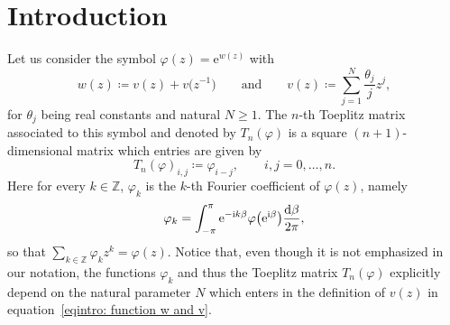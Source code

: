 \documentclass[pdftex]{sigma}%
\numberwithin{equation}{section}
\def\e{\mathrm{e}}
\begin{document}

\renewcommand{\thefootnote}{\arabic{footnote}}
\setcounter{footnote}{0}

	\section{Introduction}

Let us consider the symbol $\varphi(z)=\e^{w(z)}$ with
\begin{equation}\label{eqintro: function w and v}
w(z)\coloneqq v(z)+v\big(z^{-1}\big) \qquad\text{and}\qquad v(z)\coloneqq \sum_{j=1}^N\frac{\theta_j}{j}z^j,
\end{equation}
for $\theta_j$ being real constants and natural $N\geq 1$. The $n$-th Toeplitz matrix associated to this symbol and denoted by $T_n(\varphi)$ is a square $(n+1)$-dimensional matrix which entries are given by
\begin{equation}\label{eq:Tn}
T_n(\varphi)_{i,j} \coloneqq \varphi_{i-j}, \qquad i,j=0,\dots,n.
\end{equation}
Here for every $k\in\mathbb{Z}$, $\varphi_k$ is the $k$-th Fourier coefficient of $\varphi(z)$, namely
\begin{equation*}
\label{eq:phi k intro}
\varphi_k=\int_{-\pi}^{\pi}\e^{-{\rm i}k\beta}\varphi\big(\e^{{\rm i}\beta}\big)\frac{{\rm d}\beta }{2\pi},
\end{equation*}
so that $\sum_{k\in\mathbb{Z}}\varphi_k z^k=\varphi(z)$. Notice that, even though it is not emphasized in our notation, the functions $\varphi_k$ and thus the Toeplitz matrix $T_n(\varphi)$ explicitly depend on the natural parameter $N$ which enters in the definition of $v(z)$ in equation~\eqref{eqintro: function w and v}.
\end{document}

